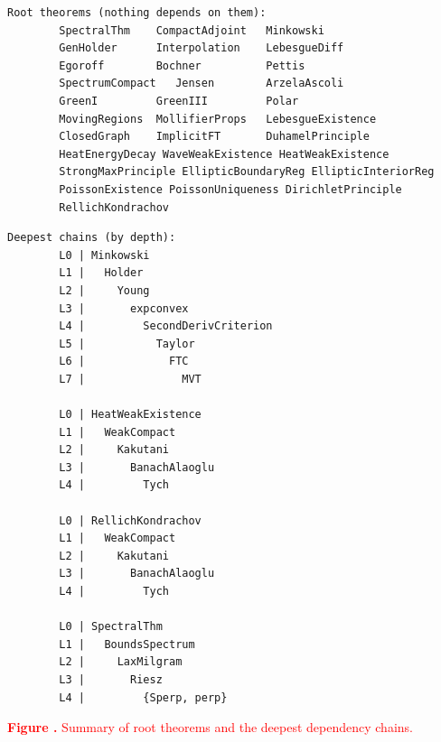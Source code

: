 \documentclass[11pt,reqno]{amsart}
\begin{document}
\begin{center}
	\begin{minipage}[c]{0.55\linewidth}
		\vspace{0pt}
		\begin{Verbatim}[frame=single,framerule=0.7pt,
		rulecolor=\color{blue!60!black},framesep=8pt,
		fontsize=\fontsize{6}{8}\selectfont,
		formatcom=\color{red}\bfseries,
		xleftmargin=6pt,xrightmargin=6pt]
		Root theorems (nothing depends on them):
		SpectralThm    CompactAdjoint   Minkowski
		GenHolder      Interpolation    LebesgueDiff
		Egoroff        Bochner          Pettis
		SpectrumCompact   Jensen        ArzelaAscoli
		GreenI         GreenIII         Polar
		MovingRegions  MollifierProps   LebesgueExistence
		ClosedGraph    ImplicitFT       DuhamelPrinciple
		HeatEnergyDecay WaveWeakExistence HeatWeakExistence
		StrongMaxPrinciple EllipticBoundaryReg EllipticInteriorReg
		PoissonExistence PoissonUniqueness DirichletPrinciple
		RellichKondrachov
		\end{Verbatim}
	\end{minipage}\hfill
	\begin{minipage}[c]{0.42\linewidth}
		\vspace{0pt}
		\begin{Verbatim}[frame=single,framerule=0.7pt,
		rulecolor=\color{blue!60!black},framesep=8pt,
		fontsize=\fontsize{6}{8}\selectfont,
		formatcom=\color{red}\bfseries,
		xleftmargin=6pt,xrightmargin=6pt]
		Deepest chains (by depth):
		L0 | Minkowski
		L1 |   Holder
		L2 |     Young
		L3 |       expconvex
		L4 |         SecondDerivCriterion
		L5 |           Taylor
		L6 |             FTC
		L7 |               MVT
		
		L0 | HeatWeakExistence
		L1 |   WeakCompact
		L2 |     Kakutani
		L3 |       BanachAlaoglu
		L4 |         Tych
		
		L0 | RellichKondrachov
		L1 |   WeakCompact
		L2 |     Kakutani
		L3 |       BanachAlaoglu
		L4 |         Tych
		
		L0 | SpectralThm
		L1 |   BoundsSpectrum
		L2 |     LaxMilgram
		L3 |       Riesz
		L4 |         {Sperp, perp}
		\end{Verbatim}
	\end{minipage}
	
	\medskip
	\noindent \text{ \ } \newline
	{\small{}\textcolor{red}{\textbf{Figure \thefigure.}\enspace
			Summary of root theorems and the deepest dependency chains.}}
	\label{fig:summary}
\end{center}
	
\end{document}

